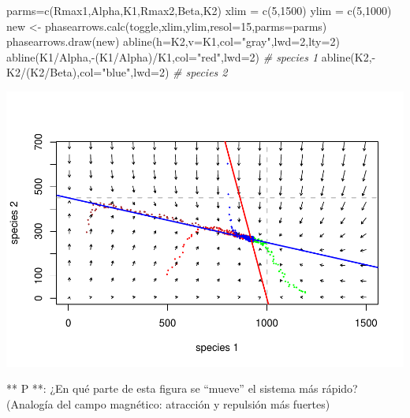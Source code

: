 \documentclass[
]{article}
\newenvironment{Shaded}{\begin{snugshade}}{\end{snugshade}}
\newcommand{\AttributeTok}[1]{\textcolor[rgb]{0.77,0.63,0.00}{#1}}
\newcommand{\CommentTok}[1]{\textcolor[rgb]{0.56,0.35,0.01}{\textit{#1}}}
\newcommand{\DecValTok}[1]{\textcolor[rgb]{0.00,0.00,0.81}{#1}}
\newcommand{\FunctionTok}[1]{\textcolor[rgb]{0.00,0.00,0.00}{#1}}
\newcommand{\NormalTok}[1]{#1}
\newcommand{\OtherTok}[1]{\textcolor[rgb]{0.56,0.35,0.01}{#1}}
\newcommand{\SpecialCharTok}[1]{\textcolor[rgb]{0.00,0.00,0.00}{#1}}
\newcommand{\StringTok}[1]{\textcolor[rgb]{0.31,0.60,0.02}{#1}}
\begin{document}
\begin{Shaded}
\begin{Highlighting}[]
\NormalTok{parms}\OtherTok{=}\FunctionTok{c}\NormalTok{(Rmax1,Alpha,K1,Rmax2,Beta,K2)}
\NormalTok{xlim }\OtherTok{=} \FunctionTok{c}\NormalTok{(}\DecValTok{5}\NormalTok{,}\DecValTok{1500}\NormalTok{)}
\NormalTok{ylim }\OtherTok{=} \FunctionTok{c}\NormalTok{(}\DecValTok{5}\NormalTok{,}\DecValTok{1000}\NormalTok{)}
\NormalTok{new }\OtherTok{\textless{}{-}} \FunctionTok{phasearrows.calc}\NormalTok{(toggle,xlim,ylim,}\AttributeTok{resol=}\DecValTok{15}\NormalTok{,}\AttributeTok{parms=}\NormalTok{parms)}
\FunctionTok{phasearrows.draw}\NormalTok{(new)}
\FunctionTok{abline}\NormalTok{(}\AttributeTok{h=}\NormalTok{K2,}\AttributeTok{v=}\NormalTok{K1,}\AttributeTok{col=}\StringTok{"gray"}\NormalTok{,}\AttributeTok{lwd=}\DecValTok{2}\NormalTok{,}\AttributeTok{lty=}\DecValTok{2}\NormalTok{)}
\FunctionTok{abline}\NormalTok{(K1}\SpecialCharTok{/}\NormalTok{Alpha,}\SpecialCharTok{{-}}\NormalTok{(K1}\SpecialCharTok{/}\NormalTok{Alpha)}\SpecialCharTok{/}\NormalTok{K1,}\AttributeTok{col=}\StringTok{"red"}\NormalTok{,}\AttributeTok{lwd=}\DecValTok{2}\NormalTok{)   }\CommentTok{\# species 1}
\FunctionTok{abline}\NormalTok{(K2,}\SpecialCharTok{{-}}\NormalTok{K2}\SpecialCharTok{/}\NormalTok{(K2}\SpecialCharTok{/}\NormalTok{Beta),}\AttributeTok{col=}\StringTok{"blue"}\NormalTok{,}\AttributeTok{lwd=}\DecValTok{2}\NormalTok{)   }\CommentTok{\# species 2}
\end{Highlighting}
\end{Shaded}

\includegraphics{LECTURE16_files/figure-latex/unnamed-chunk-15-1.pdf}

** P **: ¿En qué parte de esta figura se ``mueve'' el sistema más
rápido? (Analogía del campo magnético: atracción y repulsión más
fuertes)
\end{document}

